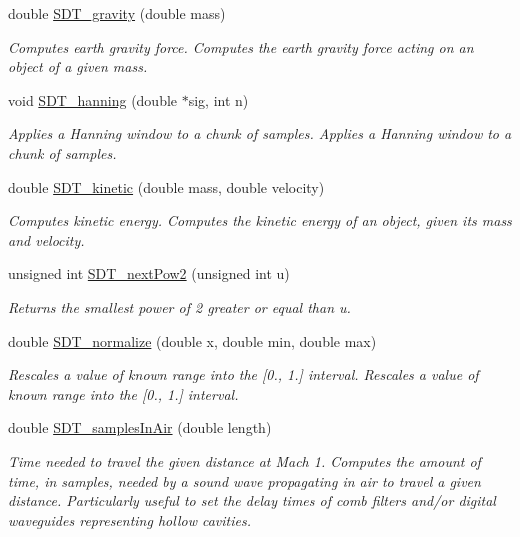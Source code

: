 \begin{DoxyCompactItemize}
double \hyperlink{group__common_ga015a2fb5c63e23e144556220011c9e54}{S\+D\+T\+\_\+gravity} (double mass)
\begin{DoxyCompactList}\small\item\em Computes earth gravity force. Computes the earth gravity force acting on an object of a given mass. \end{DoxyCompactList}\item 
void \hyperlink{group__common_gac20498f9e20eb14941b1e6f9a076e5e7}{S\+D\+T\+\_\+hanning} (double $\ast$sig, int n)
\begin{DoxyCompactList}\small\item\em Applies a Hanning window to a chunk of samples. Applies a Hanning window to a chunk of samples. \end{DoxyCompactList}\item 
double \hyperlink{group__common_gaeb3c9a2b73924440e53d81cce514db7e}{S\+D\+T\+\_\+kinetic} (double mass, double velocity)
\begin{DoxyCompactList}\small\item\em Computes kinetic energy. Computes the kinetic energy of an object, given its mass and velocity. \end{DoxyCompactList}\item 
unsigned int \hyperlink{group__common_gac19518462fef4a36e23307b17a1ae91b}{S\+D\+T\+\_\+next\+Pow2} (unsigned int u)
\begin{DoxyCompactList}\small\item\em Returns the smallest power of 2 greater or equal than u. \end{DoxyCompactList}\item 
double \hyperlink{group__common_ga526be81b39dff106d6f7026d807b90aa}{S\+D\+T\+\_\+normalize} (double x, double min, double max)
\begin{DoxyCompactList}\small\item\em Rescales a value of known range into the \mbox{[}0., 1.\mbox{]} interval. Rescales a value of known range into the \mbox{[}0., 1.\mbox{]} interval. \end{DoxyCompactList}\item 
double \hyperlink{group__common_ga8d76fd517483f6044bef411ae830aea2}{S\+D\+T\+\_\+samples\+In\+Air} (double length)
\begin{DoxyCompactList}\small\item\em Time needed to travel the given distance at Mach 1. Computes the amount of time, in samples, needed by a sound wave propagating in air to travel a given distance. Particularly useful to set the delay times of comb filters and/or digital waveguides representing hollow cavities. \end{DoxyCompactList}\item 

\end{DoxyCompactItemize}
